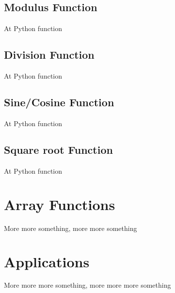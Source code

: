 \documentclass{article}
\begin{document}
		\subsection{Modulus Function}
		\paragraph{}
		At Python function
		
		\subsection{Division Function}
		\paragraph{}
		At Python function
		
		\subsection{Sine/Cosine Function}
		\paragraph{}
		At Python function
		
		\subsection{Square root Function}
		\paragraph{}
		At Python function

	\section{Array Functions}
	\paragraph{}
	More more something, more more something

	\section{Applications}
	\paragraph{}
	More more more something, more more more something

\end{document}
